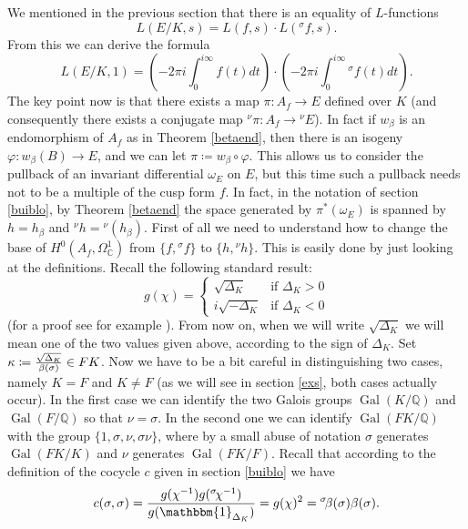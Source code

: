 \documentclass[11pt]{amsart}
\theoremstyle{definition}
\begin{document}
		We mentioned in the previous section that there is an equality of $L$-functions
		$$L(E/K,s)=L(f,s)\cdot L({{}^\sigma\!} f,s).$$
		From this we can derive the formula
			\begin{equation}\label{Lvaluequadratic}
		L(E/K,1)=\left(-2\pi i\int_0^{i\infty}f(t)dt\right)\cdot \left(-2\pi i\int_0^{i\infty}{{}^\sigma\!} f(t)dt\right).
		\end{equation}
		The key point now is that there exists a map $\pi\colon A_f\to E$ defined over $K$ (and consequently there exists a conjugate map ${{}^\nu\!} \pi\colon A_f\to {{}^\nu\!} E$). In fact if $w_{\beta}$ is an endomorphism of $A_f$ as in Theorem \ref{betaend}, then there is an isogeny $\varphi\colon w_{\beta}(B)\to E$, and we can let $\pi\coloneqq w_{\beta}\circ\varphi$. This allows us to consider the pullback of an invariant differential $\omega_E$ on $E$, but this time such a pullback needs not to be a multiple of the cusp form $f$. In fact, in the notation of section \ref{buiblo}, by Theorem \ref{betaend} the space generated by $\pi^*(\omega_E)$ is spanned by $h=h_{\beta}$ and ${{}^\nu\!} h={{}^\nu\!}(h_{\beta})$.
		First of all we need to understand how to change the base of $H^0(A_f,\Omega^1_{\mathbb{C}})$ from $\{f,{{}^\sigma\!} f\}$ to $\{h,{{}^\nu\!} h\}$. This is easily done by just looking at the definitions. Recall the following standard result:
		$$g(\chi)=\begin{cases}\sqrt{\Delta_K} & \mbox{if } \Delta_K>0\\ i\sqrt{-\Delta_K} & \mbox{if } \Delta_K<0\end{cases}$$
		(for a proof see for example \cite{lan}). From now on, when we will write $\sqrt{\Delta_K}$ we will mean one of the two values given above, according to the sign of $\Delta_K$.
		Set ${\displaystyle} \kappa\coloneqq \frac{\sqrt{\Delta_K}}{\beta(\sigma)}\in FK$. Now we have to be a bit careful in distinguishing two cases, namely $K=F$ and $K\neq F$ (as we will see in section \ref{exs}, both cases actually occur). In the first case we can identify the two Galois groups $\operatorname{Gal}(K/{\mathbb{Q}})$ and $\operatorname{Gal}(F/{\mathbb{Q}})$ so that $\nu=\sigma$. In the second one we can identify $\operatorname{Gal}(FK/{\mathbb{Q}})$ with the group $\{1,\sigma,\nu,\sigma\nu\}$, where by a small abuse of notation $\sigma$ generates $\operatorname{Gal}(FK/K)$ and $\nu$ generates $\operatorname{Gal}(FK/F)$. Recall that according to the definition of the cocycle $c$ given in section \ref{buiblo} we have		
		$$c(\sigma,\sigma)=\frac{g(\chi^{-1})g({{}^\sigma\!}\chi^{-1})}{g({\mathbbm{1}}_{\Delta_K})}=g(\chi)^2={{}^\sigma\!}\beta(\sigma)\beta(\sigma).$$
\end{document}
